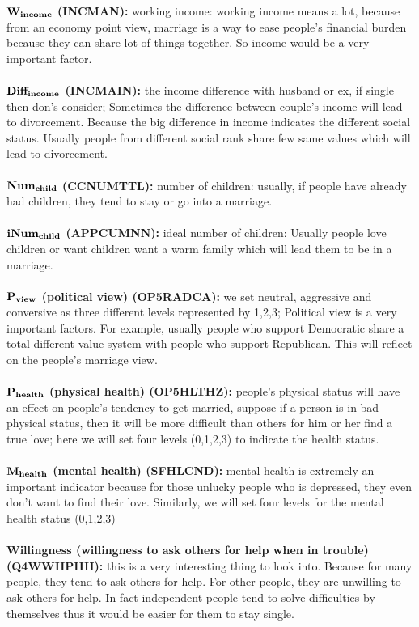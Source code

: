 \documentclass[12pt]{article}
\begin{document}
	\textbf{$\bf{W_{income}}$ (INCMAN):} working income: working income means a lot, because from an economy point view, marriage is a way to ease people’s financial burden because they can share lot of things together. So income would be a very important factor.\\\\
	\textbf{$\bf{Diff_{income}}$ (INCMAIN):} the income difference with husband or ex, if single then don’s consider; Sometimes the difference between couple’s income will lead to divorcement. Because the big difference in income indicates the different social status. Usually people from different social rank share few same values which will lead to divorcement.\\\\
	\textbf{$\bf{Num_{child}}$ (CCNUMTTL):} number of children: usually, if people have already had children, they tend to stay or go into a marriage.\\\\
	\textbf{$\bf{iNum_{child}}$ (APPCUMNN):} ideal number of children: Usually people love children or want children want a warm family which will lead them to be in a marriage.\\\\
	\textbf{$\bf{P_{view}}$ (political view) (OP5RADCA):} we set neutral, aggressive and conversive as three different levels represented by 1,2,3; Political view is a very important factors. For example, usually people who support Democratic share a total different value system with people who support Republican. This will reflect on the people’s marriage view.\\\\
	\textbf{$\bf{P_{health}}$ (physical health) (OP5HLTHZ):} people’s physical status will have an effect on people’s tendency to get married, suppose if a person is in bad physical status, then it will be more difficult than others for him or her find a true love; here we will set four levels (0,1,2,3) to indicate the health status.\\\\
	\textbf{$\bf{M_{health}}$ (mental health) (SFHLCND):} mental health is extremely an important indicator because for those unlucky people who is depressed, they even don’t want to find their love. Similarly, we will set four levels for the mental health status (0,1,2,3)\\\\
	\textbf{Willingness (willingness to ask others for help when in trouble) (Q4WWHPHH):} this is a very interesting thing to look into. Because for many people, they tend to ask others for help. For other people, they are unwilling to ask others for help. In fact independent people tend to solve difficulties by themselves thus it would be easier for them to stay single.\\\\
\end{document}
